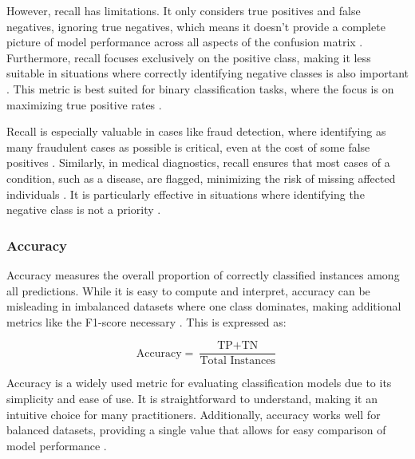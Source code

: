 However, recall has limitations. It only considers true positives and false negatives, ignoring true negatives, which means it doesn’t provide a complete picture of model performance across all aspects of the confusion matrix . Furthermore, recall focuses exclusively on the positive class, making it less suitable in situations where correctly identifying negative classes is also important . This metric is best suited for binary classification tasks, where the focus is on maximizing true positive rates \cite{bose_classification_metrics}.

Recall is especially valuable in cases like fraud detection, where identifying as many fraudulent cases as possible is critical, even at the cost of some false positives \cite{appliedai_evaluation_metrics}. Similarly, in medical diagnostics, recall ensures that most cases of a condition, such as a disease, are flagged, minimizing the risk of missing affected individuals \cite{evidentlyai_accuracy_precision_recall} . It is particularly effective in situations where identifying the negative class is not a priority \cite{bose_classification_metrics} .


\subsubsection{Accuracy}
Accuracy measures the overall proportion of correctly classified instances among all predictions. While it is easy to compute and interpret, accuracy can be misleading in imbalanced datasets where one class dominates, making additional metrics like the F1-score necessary \cite{article, dalianis2018clinical}. This is expressed as: 

\begin{equation}
    \text{Accuracy} = \frac{\text{TP} + \text{TN}}{\text{Total Instances}}
\end{equation}


Accuracy is a widely used metric for evaluating classification models due to its simplicity and ease of use. It is straightforward to understand, making it an intuitive choice for many practitioners. Additionally, accuracy works well for balanced datasets, providing a single value that allows for easy comparison of model performance \cite{bose_classification_metrics}.

